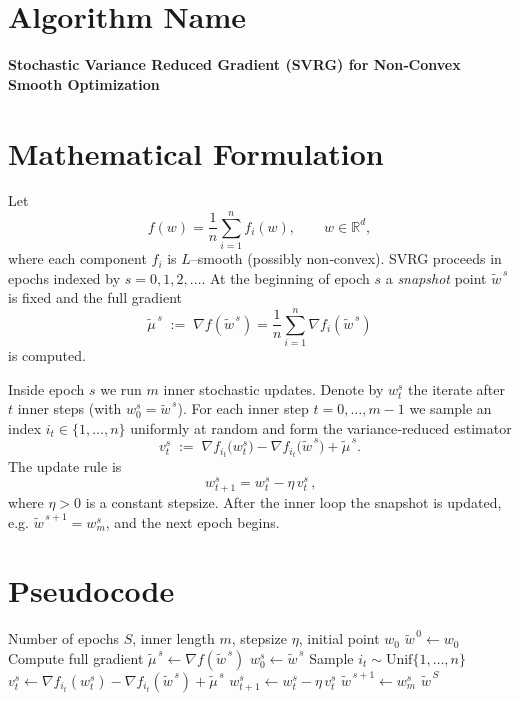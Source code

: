 \documentclass{article}
\begin{document}
\section*{Algorithm Name}
\textbf{Stochastic Variance Reduced Gradient (SVRG) for Non‑Convex Smooth Optimization}

\section*{Mathematical Formulation}
Let 
\[
f(w)=\frac{1}{n}\sum_{i=1}^{n}f_i(w),\qquad w\in\mathbb{R}^{d},
\]
where each component $f_i$ is $L$–smooth (possibly non‑convex).  
SVRG proceeds in epochs indexed by $s=0,1,2,\dots$.  
At the beginning of epoch $s$ a \emph{snapshot} point $\tilde w^{\,s}$ is fixed and the full gradient
\[
\tilde \mu^{\,s}\;:=\;\nabla f(\tilde w^{\,s})=\frac{1}{n}\sum_{i=1}^{n}\nabla f_i(\tilde w^{\,s})
\]
is computed.  

Inside epoch $s$ we run $m$ inner stochastic updates.  Denote by $w_{t}^{s}$ the iterate after $t$ inner steps (with $w_{0}^{s}=\tilde w^{\,s}$).  
For each inner step $t=0,\dots,m-1$ we sample an index $i_t\in\{1,\dots,n\}$ uniformly at random and form the variance‑reduced estimator
\[
v_t^{s}\;:=\;\nabla f_{i_t}\!\bigl(w_{t}^{s}\bigr)-\nabla f_{i_t}\!\bigl(\tilde w^{\,s}\bigr)+\tilde \mu^{\,s}.
\]
The update rule is
\[
\boxed{\,w_{t+1}^{s}=w_{t}^{s}-\eta\,v_t^{s}\,},
\]
where $\eta>0$ is a constant stepsize.  
After the inner loop the snapshot is updated, e.g. $\tilde w^{\,s+1}=w_{m}^{s}$, and the next epoch begins.

\section*{Pseudocode}
\begin{algorithm}[H]
\caption{SVRG for Non‑Convex $L$‑smooth $f$}
\begin{algorithmic}[1]
\Require Number of epochs $S$, inner length $m$, stepsize $\eta$, initial point $w_0$
\State $\tilde w^{\,0}\gets w_0$
    \State Compute full gradient $\tilde\mu^{\,s}\gets \nabla f(\tilde w^{\,s})$
    \State $w_{0}^{s}\gets \tilde w^{\,s}$
        \State Sample $i_t\sim\text{Unif}\{1,\dots,n\}$
        \State $v_t^{s}\gets \nabla f_{i_t}(w_{t}^{s})-\nabla f_{i_t}(\tilde w^{\,s})+\tilde\mu^{\,s}$
        \State $w_{t+1}^{s}\gets w_{t}^{s}-\eta\,v_t^{s}$
    \EndFor
    \State $\tilde w^{\,s+1}\gets w_{m}^{s}$ 
\EndFor
\State \Return $\tilde w^{\,S}$
\end{algorithmic}
\end{algorithm}
\end{document}
